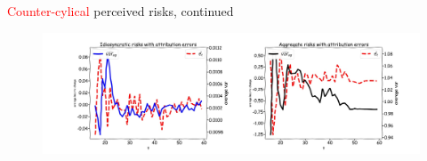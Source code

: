 \documentclass{beamer}
\begin{document}
\begin{frame}{\textcolor{red}{Counter-cylical} perceived risks, continued}
	\begin{figure}
		\centering 
		\label{var_experience_var}
		\includegraphics[width=\textwidth]{figures/var_recent_change_sim2.jpg}
	\end{figure}
\end{frame}









\end{document}
